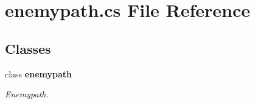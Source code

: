 \section{enemypath.\+cs File Reference}
\label{enemypath_8cs}
\subsection*{Classes}
\begin{DoxyCompactItemize}
\item 
class {\bf enemypath}
\begin{DoxyCompactList}\small\item\em Enemypath. \end{DoxyCompactList}\end{DoxyCompactItemize}
